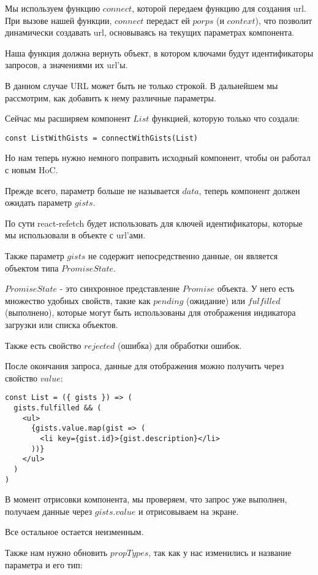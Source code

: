 Мы используем функцию $connect$, которой передаем функцию для создания url. При вызове нашей функции, $connect$ передаст ей $porps$ (и $context$), что позволит динамически создавать url, основываясь на текущих параметрах компонента.

Наша функция должна вернуть объект, в котором ключами будут идентификаторы запросов, а значениями их url'ы.

В данном случае URL может быть не только строкой. В дальнейшем мы рассмотрим, как добавить к нему различные параметры.

Сейчас мы расширяем компонент $List$ функцией, которую только что создали:

\begin{lstlisting}
const ListWithGists = connectWithGists(List)
\end{lstlisting}

Но нам теперь нужно немного поправить исходный компонент, чтобы он работал с новым HoC.

Прежде всего, параметр больше не называется $data$, теперь компонент должен ожидать параметр $gists$.

По сути react-refetch будет использовать для ключей идентификаторы, которые мы использовали в объекте с url'ами.

Также параметр $gists$ не содержит непосредственно данные, он является объектом типа $PromiseState$.

$PromiseState$ - это синхронное представление $Promise$ объекта. У него есть множество удобных свойств, такие как $pending$ (ожидание) или $fulfilled$ (выполнено), которые могут быть использованы для отображения индикатора загрузки или списка объектов.

Также есть свойство $rejected$ (ошибка) для обработки ошибок.

После окончания запроса, данные для отображения можно получить через свойство $value$:

\begin{lstlisting}
const List = ({ gists }) => (
  gists.fulfilled && (
    <ul>
      {gists.value.map(gist => (
        <li key={gist.id}>{gist.description}</li>
      ))}
    </ul> 
  )
)
\end{lstlisting}

В момент отрисовки компонента, мы проверяем, что запрос уже выполнен, получаем данные через $gists.value$ и отрисовываем на экране.

Все остальное остается неизменным.

Также нам нужно обновить $propTypes$, так как у нас изменились и название параметра и его тип:

